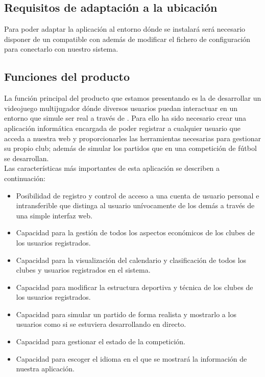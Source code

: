\subsection{Requisitos de adaptación a la ubicación}
Para poder adaptar la aplicación al entorno dónde se instalará será
necesario disponer de un  compatible con 
además de modificar el fichero de configuración para conectarlo con
nuestro sistema.

\subsection{Funciones del producto}
La función principal del producto que estamos presentando es la de
desarrollar un videojuego multijugador dónde diversos usuarios puedan
interactuar en un entorno que simule ser real a través de .
Para ello ha sido necesario crear una aplicación informática encargada
de poder registrar a cualquier usuario que acceda a nuestra web y
proporcionarles las herramientas necesarias para gestionar su propio
club; además de simular los partidos que en una competición de fútbol
se desarrollan.\\

Las características más importantes de esta aplicación se describen a
continuación:

\begin{itemize}
  \item Posibilidad de registro y control de acceso a una cuenta de
    usuario personal e intransferible que distinga al usuario
    unívocamente de los demás a través de una simple interfaz web.
  \item Capacidad para la gestión de todos los aspectos económicos de
    los clubes de los usuarios registrados.
  \item Capacidad para la visualización del calendario y clasificación
    de todos los clubes y usuarios registrados en el sistema.
  \item Capacidad para modificar la estructura deportiva y técnica de
    los clubes de los usuarios registrados.
  \item Capacidad para simular un partido de forma realista y
    mostrarlo a los usuarios como si se estuviera desarrollando en
    directo.
  \item Capacidad para gestionar el estado de la competición.
  \item Capacidad para escoger el idioma en el que se mostrará la
    información de nuestra aplicación.
\end{itemize}

